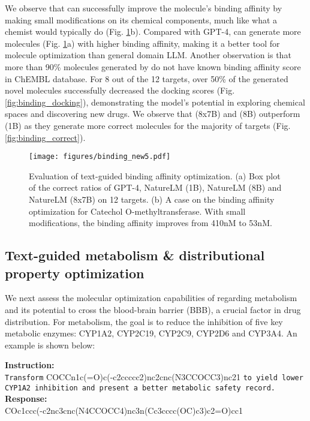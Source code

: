 We observe that \ourM{} can successfully improve the molecule's binding affinity by making small modifications on its chemical components, much like what a chemist would typically do (Fig. \ref{fig:affnity}b). Compared with GPT-4, \ourM{} can generate more molecules (Fig. \ref{fig:affnity}a) with higher binding affinity, making it a better tool for molecule optimization than general domain LLM. Another observation is that more than 90\% molecules generated by \ourM{} do not have known binding affinity score in ChEMBL database. For 8 out of the 12 targets, over 50\% of the generated novel molecules successfully decreased the docking scores (Fig. \ref{fig:binding_docking}),  demonstrating the model's potential in exploring chemical spaces and discovering new drugs. We observe that \ourM{} (8x7B) and \ourM{} (8B) outperform \ourM{} (1B) as they generate more correct molecules for the majority of targets (Fig. \ref{fig:binding_correct}).

\begin{figure}
    \centering
    \texttt{[image: figures/binding\_new5.pdf]}
    \caption{Evaluation of text-guided binding affinity optimization. (a) Box plot of the correct ratios of GPT-4, NatureLM (1B), NatureLM (8B) and NatureLM (8x7B) on 12 targets. (b) A case on the binding affinity optimization for Catechol O-methyltransferase. With small modifications, the binding affinity improves from 410nM to 53nM.}
    \label{fig:affnity}
\end{figure}


\subsection{Text-guided metabolism \& distributional property optimization}\label{sec:admet}

We next assess the molecular optimization capabilities of \ourM{} regarding metabolism and its potential to cross the blood-brain barrier (BBB), a crucial factor in drug distribution. For metabolism, the goal is to reduce the inhibition of five key metabolic enzymes: CYP1A2, CYP2C19, CYP2C9, CYP2D6 and CYP3A4. An example is shown below:

\begin{example} 
{{
\small
\textbf{Instruction: }\\\texttt{Transform} \mol{}COCCn1c(=O)c(-c2ccccc2)nc2cnc(N3CCOCC3)nc21\emol{} \texttt{to yield lower CYP1A2 inhibition and present a better metabolic safety record.}\\
    \textbf{Response: }\\\mol{}COc1ccc(-c2nc3cnc(N4CCOCC4)nc3n(Cc3cccc(OC)c3)c2=O)cc1\emol{}
}}
\end{example}  

